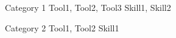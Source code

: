 

\begin{cvskills}

  \cvskill
    {Category 1}
    {Tool1, Tool2, Tool3 \textbullet{} Skill1, Skill2}

  \cvskill
    {Category 2}
    {Tool1, Tool2 \textbullet{} Skill1}

\end{cvskills}
